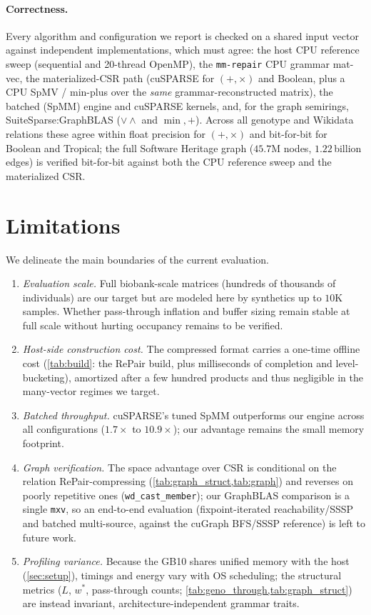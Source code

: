 \documentclass[twoside,leqno,twocolumn]{article}
\begin{document}
\paragraph{Correctness.} Every algorithm and configuration we report is checked on a shared input vector against independent implementations, which must agree: the host CPU reference sweep (sequential and 20-thread OpenMP), the \texttt{mm-repair} CPU grammar mat-vec, the materialized-CSR path (cuSPARSE for $(+,\times)$ and Boolean, plus a CPU SpMV / min-plus over the \emph{same} grammar-reconstructed matrix), the batched (SpMM) engine and cuSPARSE kernels, and, for the graph semirings, SuiteSparse:GraphBLAS ($\lor\!\land$ and $\min,+$). Across all genotype and Wikidata relations these agree within float precision for $(+,\times)$ and bit-for-bit for Boolean and Tropical; the full Software Heritage graph ($45.7$M nodes, $1.22$\,billion edges) is verified bit-for-bit against both the CPU reference sweep and the materialized CSR.

\section{Limitations}
\label{sec:limitations}

We delineate the main boundaries of the current evaluation.

\begin{enumerate}
    \item \emph{Evaluation scale.} Full biobank-scale matrices (hundreds of thousands of individuals) are our target but are modeled here by synthetics up to $10\text{K}$ samples. Whether pass-through inflation and buffer sizing remain stable at full scale without hurting occupancy remains to be verified.
    \item \emph{Host-side construction cost.} The compressed format carries a one-time offline cost (\cref{tab:build}: the RePair build, plus milliseconds of completion and level-bucketing), amortized after a few hundred products and thus negligible in the many-vector regimes we target.
    \item \emph{Batched throughput.} cuSPARSE's tuned SpMM outperforms our engine across all configurations ($1.7\times$ to $10.9\times$); our advantage remains the small memory footprint.
    \item \emph{Graph verification.} The space advantage over CSR is conditional on the relation RePair-compressing (\cref{tab:graph_struct,tab:graph}) and reverses on poorly repetitive ones (\texttt{wd\_cast\_member}); our GraphBLAS comparison is a single \texttt{mxv}, so an end-to-end evaluation (fixpoint-iterated reachability/SSSP and batched multi-source, against the cuGraph BFS/SSSP reference) is left to future work.
    \item \emph{Profiling variance.} Because the GB10 shares unified memory with the host (\cref{sec:setup}), timings and energy vary with OS scheduling; the structural metrics ($L$, $w^{*}$, pass-through counts; \cref{tab:geno_through,tab:graph_struct}) are instead invariant, architecture-independent grammar traits.
\end{enumerate}
\end{document}
